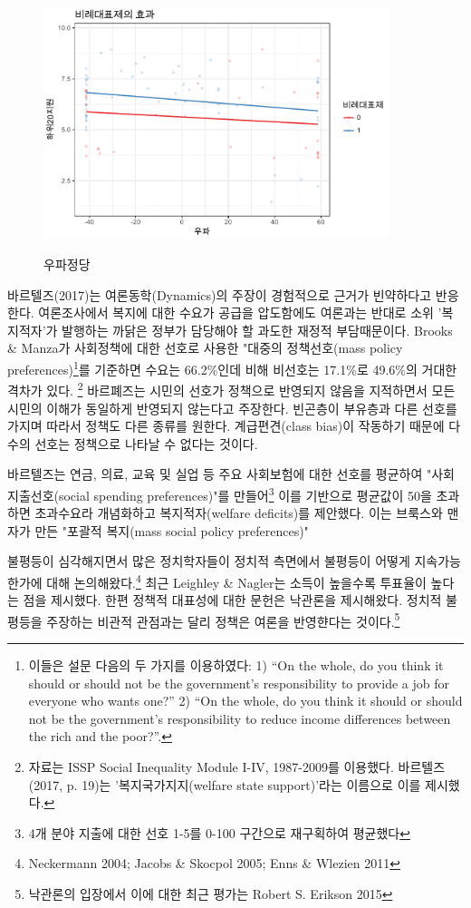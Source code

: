 \documentclass[12pt,a4paper]{book}
\begin{document}
\begin{figure}
\centering
        \includegraphics[width=0.9\textwidth]{pr_right.pdf}\\
        \caption{우파정당}
\end{figure}

바르텔즈(2017)는 여론동학(Dynamics)의 주장이 경험적으로 근거가 빈약하다고 반응한다. 여론조사에서 복지에 대한 수요가 공급을 압도함에도 여론과는 반대로 소위 '복지적자'가 발행하는 까닭은 정부가 담당해야 할 과도한 재정적 부담때문이다. Brooks \& Manza가 사회정책에 대한 선호로 사용한 "대중의 정책선호(mass policy preferences)\footnote{이들은 설문 다음의 두 가지를 이용하였다: 1) “On the whole, do you think it should or should not be the government’s responsibility to provide a job for everyone who wants one?” 2) “On the whole, do you think it should or should not be the government’s responsibility to reduce income differences between the rich and the poor?”.}를 기준하면 수요는 66.2\%인데 비해 비선호는 17.1\%로 49.6\%의 거대한 격차가 있다. \footnote{자료는 ISSP Social Inequality Module I-IV, 1987-2009를 이용했다. 바르텔즈(2017, p. 19)는 '복지국가지지(welfare state support)'라는 이름으로 이를  제시했다.}  바르폐즈는 시민의 선호가 정책으로 반영되지 않음을 지적하면서 모든 시민의 이해가 동일하게 반영되지 않는다고 주장한다. 빈곤층이 부유층과 다른 선호를 가지며 따라서 정책도 다른 종류를 원한다. 계급편견(class bias)이 작동하기 때문에 다수의 선호는 정책으로 나타날 수 없다는 것이다. 

바르텔즈는 연금, 의료, 교육 및 실업 등 주요 사회보험에 대한 선호를 평균하여 "사회지출선호(social spending preferences)"를 만들어\footnote{4개 분야 지출에 대한 선호 1-5를 0-100 구간으로 재구획하여 평균했다} 이를 기반으로 평균값이 50을 초과하면 초과수요라 개념화하고 복지적자(welfare deficits)를 제안했다.  이는 브룩스와 맨자가 만든 "포괄적 복지(mass social policy preferences)"

불평등이 심각해지면서 많은 정치학자들이 정치적 측면에서 불평등이 어떻게 지속가능한가에 대해 논의해왔다.\footnote{Neckermann 2004; Jacobs \& Skocpol 2005; Enns \& Wlezien 2011} 최근 Leighley \& Nagler는 소득이 높을수록 투표율이 높다는 점을 제시했다. 한편 정책적 대표성에 대한 문헌은 낙관론을 제시해왔다. 정치적 불평등을 주장하는 비관적 관점과는 달리 정책은 여론을 반영햔다는 것이다.\footnote{낙관론의 입장에서 이에 대한 최근 평가는 Robert S. Erikson 2015} 
\end{document}

